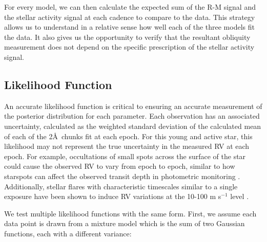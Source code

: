 \documentclass[twocolumn]{aastex63}
\begin{document}
For every model, we can then calculate the expected sum of the R-M signal and the stellar activity signal at each cadence to compare to the data. 
This strategy allows us to understand in a relative sense how well each of the three models fit the data. 
It also gives us the opportunity to verify that the resultant obliquity measurement does not depend on the specific prescription of the stellar activity signal.




\subsection{Likelihood Function}

An accurate likelihood function is critical to ensuring an accurate measurement of the posterior distribution for each parameter.
Each observation has an associated uncertainty, calculated as the weighted standard deviation of the calculated mean of each of the 2\AA\ chunks fit at each epoch.
For this young and active star, this likelihood may not represent the true uncertainty in the measured RV at each epoch. 
For example, occultations of small spots across the surface of the star could cause the observed RV to vary from epoch to epoch, similar to how starspots can affect the observed transit depth in photometric monitoring \citep{SanchisOjeda13}.
Additionally, stellar flares with characteristic timescales similar to a single exposure have been shown to induce RV variations at the 10-100 m s$^{-1}$ level \citep{Reiners09}.

We test multiple likelihood functions with the same form.
First, we assume each data point is drawn from a mixture model \citep[e.g.][]{McLachlan00} which is the sum of two Gaussian functions, each with a different variance:
\end{document}
